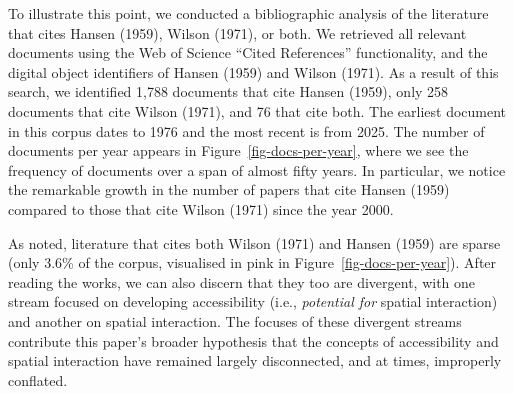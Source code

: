 \documentclass[
]{article}
\begin{document}
To illustrate this point, we conducted a bibliographic analysis of the
literature that cites Hansen (1959), Wilson (1971), or both. We
retrieved all relevant documents using the Web of Science ``Cited
References'' functionality, and the digital object identifiers of Hansen
(1959) and Wilson (1971). As a result of this search, we identified
1,788 documents that cite Hansen (1959), only 258 documents that cite
Wilson (1971), and 76 that cite both. The earliest document in this
corpus dates to 1976 and the most recent is from 2025. The number of
documents per year appears in Figure~\ref{fig-docs-per-year}, where we
see the frequency of documents over a span of almost fifty years. In
particular, we notice the remarkable growth in the number of papers that
cite Hansen (1959) compared to those that cite Wilson (1971) since the
year 2000.

As noted, literature that cites both Wilson (1971) and Hansen (1959) are
sparse (only 3.6\% of the corpus, visualised in pink in
Figure~\ref{fig-docs-per-year}). After reading the works, we can also
discern that they too are divergent, with one stream focused on
developing accessibility (i.e., \emph{potential for} spatial
interaction) and another on spatial interaction. The focuses of these
divergent streams contribute this paper's broader hypothesis that the
concepts of accessibility and spatial interaction have remained largely
disconnected, and at times, improperly conflated.
\end{document}
